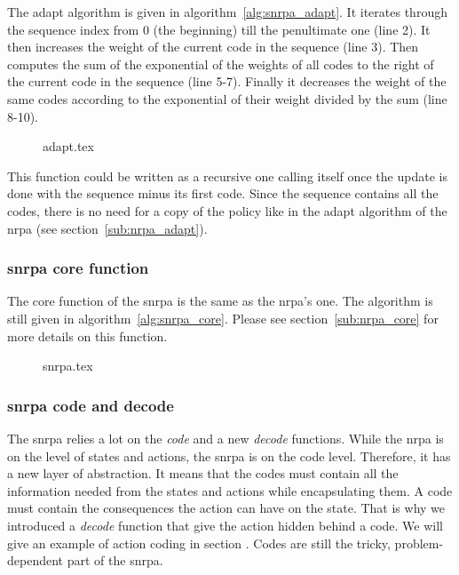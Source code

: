 The adapt algorithm is given in algorithm~\ref{alg:snrpa_adapt}.
It iterates through the sequence index from 0 (the beginning) till the penultimate one (line 2).
It then increases the weight of the current code in the sequence (line 3).
Then computes the sum of the exponential of the weights of all codes to the right of the current code in the sequence (line 5-7).
Finally it decreases the weight of the same codes according to the exponential of their weight divided by the sum (line 8-10).

\begin{figure}[htpb]
    \centering
    \begin{minipage}{.7\linewidth}
        {adapt.tex}
    \end{minipage}
\end{figure}

This function could be written as a recursive one calling itself once the update is done with the sequence minus its first code.
Since the sequence contains all the codes, there is no need for a copy of the policy like in the adapt algorithm of the \gls{nrpa} (see section~\ref{sub:nrpa_adapt}).

\subsubsection{\acrshort{snrpa} core function}%
\label{ssub:snrpa_core_function}

The core function of the \gls{snrpa} is the same as the \gls{nrpa}'s one.
The algorithm is still given in algorithm~\ref{alg:snrpa_core}.
Please see section~\ref{sub:nrpa_core} for more details on this function.

\begin{figure}[htpb]
    \centering
    \begin{minipage}{.7\linewidth}
        {snrpa.tex}
    \end{minipage}
\end{figure}

\subsubsection{\acrshort{snrpa} code and decode}%
\label{ssub:snrpa_code_decode}

The \gls{snrpa} relies a lot on the \textit{code} and a new \textit{decode} functions.
While the \gls{nrpa} is on the level of states and actions, the \gls{snrpa} is on the code level.
Therefore, it has a new layer of abstraction.
It means that the codes must contain all the information needed from the states and actions while encapsulating them.
A code must contain the consequences the action can have on the state.
That is why we introduced a \textit{decode} function that give the action hidden behind a code.
We will give an example of action coding in section .
Codes are still the tricky, problem-dependent part of the \gls{snrpa}.

